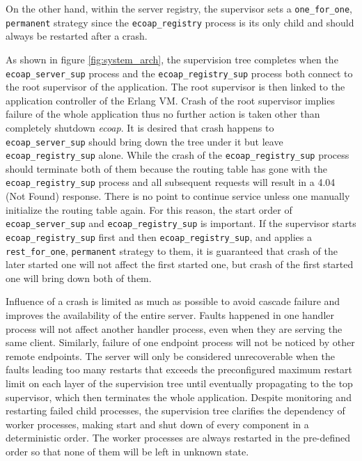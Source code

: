 On the other hand, within the server registry, the supervisor sets a \verb|one_for_one|, \verb|permanent| strategy since the \verb|ecoap_registry| process is its only child and should always be restarted after a crash. 

As shown in figure \ref{fig:system_arch}, the supervision tree completes when the \verb|ecoap_server_sup| process and the \verb|ecoap_registry_sup| process both connect to the root supervisor of the application. The root supervisor is then linked to the application controller of the Erlang VM. Crash of the root supervisor implies failure of the whole application thus no further action is taken other than completely shutdown \textit{ecoap}. It is desired that crash happens to \verb|ecoap_server_sup| should bring down the tree under it but leave \verb|ecoap_registry_sup| alone. While the crash of the \verb|ecoap_registry_sup| process should terminate both of them because the routing table has gone with the \verb|ecoap_registry_sup| process and all subsequent requests will result in a 4.04 (Not Found) response. There is no point to continue service unless one manually initialize the routing table again. For this reason, the start order of \verb|ecoap_server_sup| and \verb|ecoap_registry_sup| is important. If the supervisor starts \verb|ecoap_registry_sup| first and then \verb|ecoap_registry_sup|, and applies a \verb|rest_for_one|, \verb|permanent| strategy to them, it is guaranteed that crash of the later started one will not affect the first started one, but crash of the first started one will bring down both of them. 

Influence of a crash is limited as much as possible to avoid cascade failure and improves the availability of the entire server. Faults happened in one handler process will not affect another handler process, even when they are serving the same client. Similarly, failure of one endpoint process will not be noticed by other remote endpoints. The server will only be considered unrecoverable when the faults leading too many restarts that exceeds the preconfigured maximum restart limit on each layer of the supervision tree until eventually propagating to the top supervisor, which then terminates the whole application. Despite monitoring and restarting failed child processes, the supervision tree clarifies the dependency of worker processes, making start and shut down of every component in a deterministic order. The worker processes are always restarted in the pre-defined order so that none of them will be left in unknown state. 

